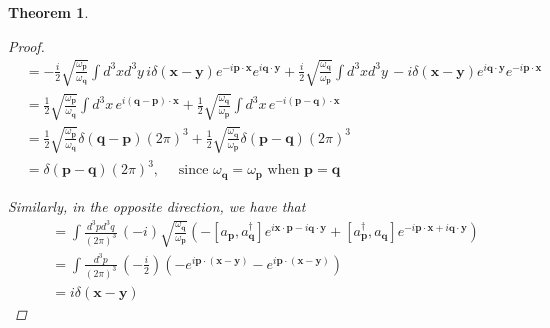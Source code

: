 \documentclass[11pt, oneside]{article}   	%
\theoremstyle{newline}
\theoremstyle{newline}
\newtheorem*{thm}{Theorem}
\theoremstyle{newline}
\theoremstyle{newline}
\theoremstyle{newline}
\newcommand{\intp}{ \int \frac{ d^3 p }{ (2 \pi)^3 } \, }
\newcommand{\ann}[1]{a_{ \mathbf{ #1 }}}
\newcommand{\crea}[1]{a^\dagger_{ \mathbf{ #1 }}}
\newcommand{\ve}[1]{ \mathbf{ #1 } }
\newcommand{\mode}[ 1]{ e^{ i \mathbf{ #1 } \cdot \mathbf{x} }}
\newcommand{\nmode}[1]{ e^{  - i \mathbf{ #1 } \cdot \mathbf{x} }}
\newcommand{\freq}[1]{\omega_\mathbf{ #1} }
\newcommand{\scal}[1]{\phi ( \mathbf{ #1 })}
\newcommand{\mom}[1]{ \pi (\mathbf{ #1 })}
\begin{document}
\begin{thm}
\begin{proof}
\begin{align*}
&= - \frac{ i }{2}  \sqrt{ \frac{ \freq{p}}{ \freq {q} } } \int d^ 3 x d^3 y\,  i \delta ( \ve{ x - y} ) \nmode{p} e^{  i \mathbf{q} \cdot \mathbf{y } }  + \frac{ i }{ 2} \sqrt { \frac{ \freq{q} } { \freq{p}}} \int d^ 3 x d^ 3 y\,   - i \delta ( \ve{ x -y } ) e^{ i \mathbf{q} \cdot \mathbf{y } } \nmode{p } \\
& = \frac{ 1} { 2} \sqrt { \frac{ \freq{ p } } { \freq{q}}} \int d^3 x\,  \mode{ (q-p)} + \frac{ 1} {2} \sqrt { \frac{ \freq{q}}{ \freq{p}}} \int d^3 x \, \nmode{(p-q)  } \\
&= \frac{ 1}{ 2} \sqrt{ \frac{ \freq{p}} { \freq{q}}} \delta( \ve{ q - p  } ) ( 2 \pi ) ^3  + \frac{ 1}{ 2} \sqrt{ \frac{ \freq{q} } { \freq{p }}} \delta ( \ve{ p - q } ) ( 2 \pi ) ^  3 \\
& = \delta ( \ve{ p - q } ) ( 2 \pi )^ 3, \quad \text{ since } \freq{q} = \freq{ p} \text { when } \ve{p}  = \ve{ q } 
\end{align*} 

Similarly, in the opposite direction, we have that 
\begin{align*} 
[ \scal{x}, \mom{y} ] &= \int \frac{ d^ 3 p d^3 q } { ( 2\pi) ^ 3 } \, ( -i ) \sqrt{ \frac{ \freq{ q } } { \freq{ p } } } \left( - [ \ann{p}, \crea{ q} ] e^{ i \mathbf{ x} \cdot \mathbf{p}  - i \mathbf{ q} \cdot \mathbf{ y } } + [ \crea{ p } , \ann{ q} ] e^{  - i \mathbf{ p } \cdot \mathbf{ x } + i \mathbf{ q} \cdot \mathbf{ y}} \right) \\
& = \intp (  - \frac{ i } { 2} ) \left(  - e^{ i \mathbf{p } \cdot ( \ve{ x - y} ) } - e^{ i \mathbf{ p } \cdot ( \ve{ x -y}  )   } \right) \\
&= i \delta ( \ve{x - y } )  
\end{align*} 
\end{proof} 
\end{thm} 
\end{document}
